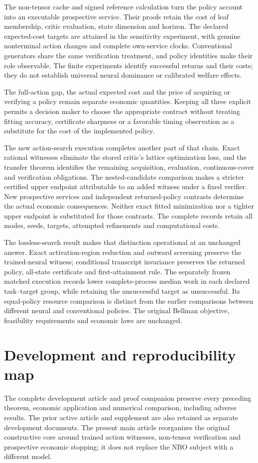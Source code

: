 \documentclass[ecta,nameyear,draft]{econsocart}
\begin{document}
The non-tensor cache and signed reference calculation turn the policy account into an executable prospective service. Their proofs retain the cost of leaf membership, critic evaluation, state dimension and horizon. The declared expected-cost targets are attained in the sensitivity experiment, with genuine nonterminal action changes and complete own-service clocks. Conventional generators share the same verification treatment, and policy identities make their role observable. The finite experiments identify successful returns and their costs; they do not establish universal neural dominance or calibrated welfare effects.

The full-action gap, the actual expected cost and the price of acquiring or verifying a policy remain separate economic quantities. Keeping all three explicit permits a decision maker to choose the appropriate contract without treating fitting accuracy, certificate sharpness or a favorable timing observation as a substitute for the cost of the implemented policy.

The new action-search execution completes another part of that chain. Exact rational witnesses eliminate the stored critic's lattice optimization loss, and the transfer theorem identifies the remaining acquisition, evaluation, continuous-cover and verification obligations. The nested-candidate comparison makes a stricter certified upper endpoint attributable to an added witness under a fixed verifier. New prospective services and independent returned-policy contrasts determine the actual economic consequences. Neither exact fitted minimization nor a tighter upper endpoint is substituted for those contrasts. The complete records retain all modes, seeds, targets, attempted refinements and computational costs.

The lossless-search result makes that distinction operational at an unchanged answer. Exact activation-region reduction and outward screening preserve the trained-neural witness; conditional transcript invariance preserves the returned policy, all-state certificate and first-attainment rule. The separately frozen matched execution records lower complete-process median work in each declared task--target group, while retaining the unsuccessful target as unsuccessful. Its equal-policy resource comparison is distinct from the earlier comparisons between different neural and conventional policies. The original Bellman objective, feasibility requirements and economic laws are unchanged.


\appendix
\section{Development and reproducibility map}\label{sec:map56}
The complete development article and proof companion preserve every preceding theorem, economic application and numerical comparison, including adverse results. The prior active article and supplement are also retained as separate development documents. The present main article reorganizes the original constructive core around trained action witnesses, non-tensor verification and prospective economic stopping; it does not replace the NBO subject with a different model.
\end{document}
